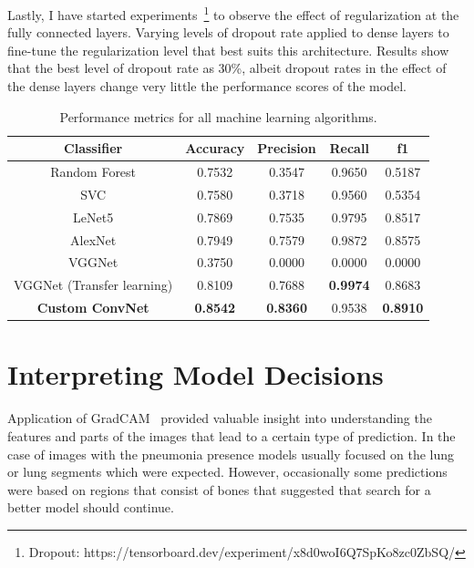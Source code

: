 Lastly, I have started experiments~\footnote{Dropout: https://tensorboard.dev/experiment/x8d0woI6Q7SpKo8zc0ZbSQ/} to observe the effect of regularization at the fully connected layers.
Varying levels of dropout rate applied to dense layers to fine-tune the regularization level that best suits this architecture. Results show that the best level of dropout rate as 30\%, albeit dropout rates in the effect of the dense layers change very little the performance scores of the model.

\begin{table}[H]
    \centering
    \begin{tabular}{||c c c c c||} 
    \hline
    Classifier & Accuracy & Precision & Recall & f1\\ [0.5ex] 
    \hline\hline
    Random Forest & 0.7532 & 0.3547 & 0.9650 & 0.5187\\ 
    \hline
    SVC & 0.7580 & 0.3718 & 0.9560 & 0.5354\\
    \hline
    LeNet5 & 0.7869 & 0.7535 & 0.9795 & 0.8517\\
    \hline
    AlexNet & 0.7949 & 0.7579 & 0.9872 & 0.8575\\
    \hline
    VGGNet & 0.3750 & 0.0000 & 0.0000 & 0.0000\\
    \hline
    VGGNet (Transfer learning) & 0.8109 & 0.7688 & \textbf{0.9974} & 0.8683\\
    \hline
    \textbf{Custom ConvNet} & \textbf{0.8542} & \textbf{0.8360} & 0.9538 & \textbf{0.8910}\\
    \hline
    \end{tabular}
    \caption{Performance metrics for all machine learning algorithms.}
    \label{table:allmlmetrics}
\end{table}

\section{Interpreting Model Decisions}
Application of GradCAM~\cite{cam} provided valuable insight into understanding the features and parts of the images that lead to a certain type of prediction.
In the case of images with the pneumonia presence models usually focused on the lung or lung segments which were expected.
However, occasionally some predictions were based on regions that consist of bones that suggested that search for a better model should continue.

